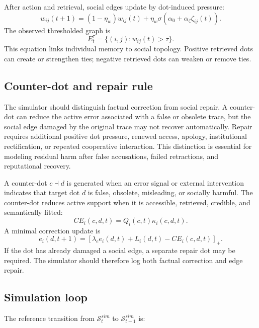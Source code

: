 \documentclass[11pt]{article}
\theoremstyle{remark}
\begin{document}
After action and retrieval, social edges update by dot-induced pressure:
$$
w_{ij}(t+1)=
(1-\eta_w)w_{ij}(t)+\eta_w\sigma(\alpha_0+\alpha_\zeta \zeta_{ij}(t)).
$$
The observed thresholded graph is
$$
E_t^\tau=\{(i,j):w_{ij}(t)>\tau\}.
$$
This equation links individual memory to social topology. Positive
retrieved dots can create or strengthen ties; negative retrieved dots
can weaken or remove ties.

\subsection{Counter-dot and repair rule}\label{minimal-counter-dot-rule}

The simulator should distinguish factual correction from social repair. A counter-dot can reduce the active error associated with a false or obsolete trace, but the social edge damaged by the original trace may not recover automatically. Repair requires additional positive dot pressure, renewed access, apology, institutional rectification, or repeated cooperative interaction. This distinction is essential for modeling residual harm after false accusations, failed retractions, and reputational recovery.


A counter-dot $c\dashv d$ is generated when an error signal or external
intervention indicates that target dot $d$ is false, obsolete,
misleading, or socially harmful. The counter-dot reduces active support
when it is accessible, retrieved, credible, and semantically fitted:
$$
CE_i(c,d,t)=Q_i(c,t)\kappa_i(c,d,t).
$$
A minimal correction update is
$$
e_i(d,t+1)=\left[\lambda_e e_i(d,t)+L_i(d,t)-CE_i(c,d,t)\right]_+.
$$
If the dot has already damaged a social edge, a separate repair dot may
be required. The simulator should therefore log both factual correction
and edge repair.

\subsection{Simulation loop}\label{minimal-simulation-loop}

The reference transition from $\mathcal S_t^{sim}$ to
$\mathcal S_{t+1}^{sim}$ is:
\end{document}
